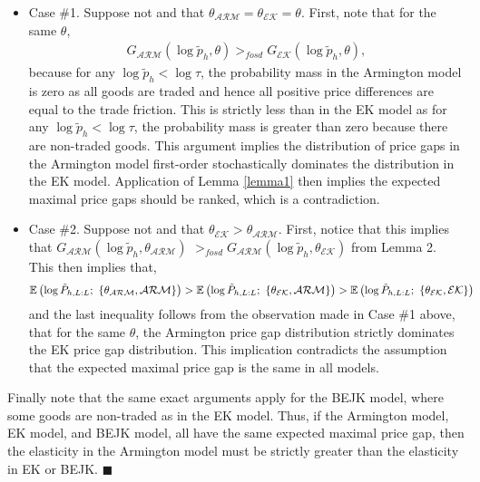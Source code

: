 \documentclass[12pt,dvips, ps2pdf]{article}
\begin{document}
\begin{itemize}
\item Case \#1. Suppose not and that $\theta_{\mathcal{ARM}} = \theta_{\mathcal{EK}} = \theta$. First, note that for the same $\theta$,
    \begin{align}
    G_{\mathcal{ARM}}(\log \tilde p_{h}, \theta )>_{fosd} G_{\mathcal{EK}}(\log \tilde p_{h}, \theta),
    \end{align}
     because for any $\log \tilde p_{h} < \log \tau$, the probability mass in the Armington model is zero as all goods are traded and hence all positive price differences are equal to the trade friction. This is strictly less than in the EK model as for any $\log \tilde p_{h} < \log \tau$, the probability mass is greater than zero because there are non-traded goods. This argument implies the distribution of price gaps in the Armington model first-order stochastically dominates the distribution in the EK model. Application of Lemma \ref{lemma1} then implies the expected maximal price gaps should be ranked, which is a contradiction.

\item Case \#2. Suppose not and that $\theta_{\mathcal{EK}} > \theta_{\mathcal{ARM}}$. First, notice that this implies that $G_{\mathcal{ARM}}(\log \tilde p_{h}, \theta_{\mathcal{ARM}})$ $>_{fosd} G_{\mathcal{ARM}}(\log \tilde p_{h}, \theta_{\mathcal{EK}})$ from Lemma 2. This then implies that,
\begin{align}
\mathbb{E}\left(\log \tilde P_{h,L:L}; \ \left\{\theta_\mathcal{ARM},{\mathcal{ARM}}\right\}\right) &>\mathbb{E}\left(\log \tilde P_{h,L:L}; \ \left\{\theta_\mathcal{EK},{\mathcal{ARM}}\right\}\right)  >\mathbb{E}\left(\log \tilde P_{h,L:L}; \ \left\{\theta_\mathcal{EK},{\mathcal{EK}}\right\}\right) \notag
 \end{align}
and the last inequality follows from the observation made in Case \#1 above, that for the same $\theta$, the Armington price gap distribution strictly dominates the EK price gap distribution. This implication contradicts the assumption that the expected maximal price gap is the same in all models.
\end{itemize}
\vspace{-.25cm}
Finally note that the same exact arguments apply for the BEJK model, where some goods are non-traded as in the EK model. Thus, if the Armington model, EK model, and BEJK model, all have the same expected maximal price gap, then the elasticity in the Armington model must be strictly greater than the elasticity in EK or BEJK. $\blacksquare$
\end{document}
